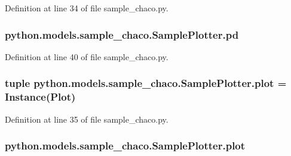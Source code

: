 Definition at line 34 of file sample\-\_\-chaco.\-py.

\hypertarget{classpython_1_1models_1_1sample__chaco_1_1_sample_plotter_a15fcff607d621a791088d0750eac84a1}{
\subsubsection[{pd}]{\setlength{\rightskip}{0pt plus 5cm}python.\-models.\-sample\-\_\-chaco.\-Sample\-Plotter.\-pd}}\label{classpython_1_1models_1_1sample__chaco_1_1_sample_plotter_a15fcff607d621a791088d0750eac84a1}


Definition at line 40 of file sample\-\_\-chaco.\-py.

\hypertarget{classpython_1_1models_1_1sample__chaco_1_1_sample_plotter_a8e901fcc7105ddc98ae4d9681ed1d685}{
\subsubsection[{plot}]{\setlength{\rightskip}{0pt plus 5cm}tuple python.\-models.\-sample\-\_\-chaco.\-Sample\-Plotter.\-plot = Instance(Plot)\hspace{0.3cm}{\ttfamily [static]}}}\label{classpython_1_1models_1_1sample__chaco_1_1_sample_plotter_a8e901fcc7105ddc98ae4d9681ed1d685}


Definition at line 35 of file sample\-\_\-chaco.\-py.

\hypertarget{classpython_1_1models_1_1sample__chaco_1_1_sample_plotter_aaafc3df523f88f9831b6ab04c4e73a9e}{
\subsubsection[{plot}]{\setlength{\rightskip}{0pt plus 5cm}python.\-models.\-sample\-\_\-chaco.\-Sample\-Plotter.\-plot}}\label{classpython_1_1models_1_1sample__chaco_1_1_sample_plotter_aaafc3df523f88f9831b6ab04c4e73a9e}


